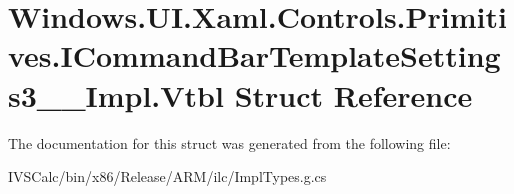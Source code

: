 \hypertarget{struct_windows_1_1_u_i_1_1_xaml_1_1_controls_1_1_primitives_1_1_i_command_bar_template_settings3_____impl_1_1_vtbl}{}\section{Windows.\+U\+I.\+Xaml.\+Controls.\+Primitives.\+I\+Command\+Bar\+Template\+Settings3\+\_\+\+\_\+\+Impl.\+Vtbl Struct Reference}
\label{struct_windows_1_1_u_i_1_1_xaml_1_1_controls_1_1_primitives_1_1_i_command_bar_template_settings3_____impl_1_1_vtbl}


The documentation for this struct was generated from the following file\+:\begin{DoxyCompactItemize}
\item 
I\+V\+S\+Calc/bin/x86/\+Release/\+A\+R\+M/ilc/Impl\+Types.\+g.\+cs\end{DoxyCompactItemize}
